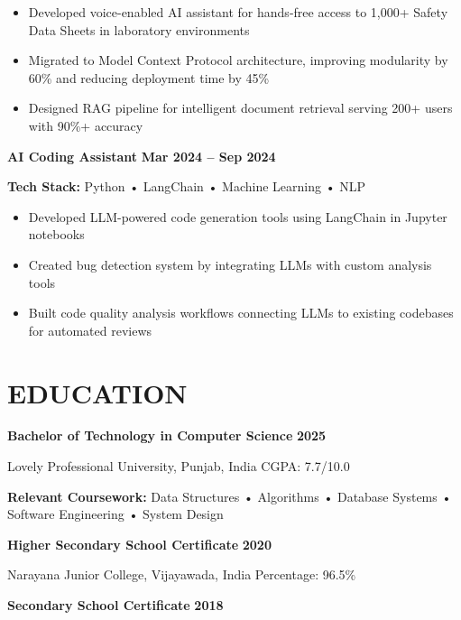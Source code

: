 \documentclass[10pt,a4paper]{article}
\newcommand{\project}[2]{\textbf{#1} \hfill \textbf{#2}\vspace{1pt}}
\begin{document}
\begin{itemize}[leftmargin=1.3em, itemsep=0pt, parsep=0pt, topsep=1pt]
    \item Developed voice-enabled AI assistant for hands-free access to 1,000+ Safety Data Sheets in laboratory environments
    \item Migrated to Model Context Protocol architecture, improving modularity by 60\% and reducing deployment time by 45\%
    \item Designed RAG pipeline for intelligent document retrieval serving 200+ users with 90\%+ accuracy
\end{itemize}

\vspace{2pt}

\project{AI Coding Assistant}{Mar 2024 -- Sep 2024}

\textbf{Tech Stack:} Python • LangChain • Machine Learning • NLP

\begin{itemize}[leftmargin=1.3em, itemsep=0pt, parsep=0pt, topsep=1pt]
    \item Developed LLM-powered code generation tools using LangChain in Jupyter notebooks
    \item Created bug detection system by integrating LLMs with custom analysis tools
    \item Built code quality analysis workflows connecting LLMs to existing codebases for automated reviews
\end{itemize}

\section*{EDUCATION}

\textbf{Bachelor of Technology in Computer Science} \hfill \textbf{2025}

Lovely Professional University, Punjab, India \hfill CGPA: 7.7/10.0

\textbf{Relevant Coursework:} Data Structures • Algorithms • Database Systems • Software Engineering • System Design

\vspace{2pt}

\textbf{Higher Secondary School Certificate} \hfill \textbf{2020}

Narayana Junior College, Vijayawada, India \hfill Percentage: 96.5\%

\vspace{2pt}

\textbf{Secondary School Certificate} \hfill \textbf{2018}
\end{document}
